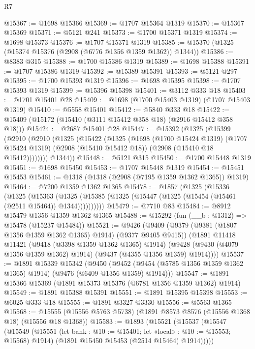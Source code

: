 \begin{lexlean}{R7}
\begin{coremodule}
@15367 := @1698 @15366
@15369 := @1707 @15364 @1319
@15370 := @15367 @15369
@15371 := @5121 @241
@15373 := @1700 @15371 @1319
@15374 := @1698 @15373
@15376 := @1707 @15371 @1319
@15385 := @15370 (@1325 (@15374 @15376 (@2908 (@6776 @1356 @1359 @1362)) @1344))
@15386 := @8383 @315
@15388 := @1700 @15386 @1319
@15389 := @1698 @15388
@15391 := @1707 @15386 @1319
@15392 := @15389 @15391
@15393 := @5121 @297
@15395 := @1700 @15393 @1319
@15396 := @1698 @15395
@15398 := @1707 @15393 @1319
@15399 := @15396 @15398
@15401 := @3112 @333 @18
@15403 := @1701 @15401 @28
@15409 := @1698 (@1700 @15403 @1319) (@1707 @15403 @1319)
@15410 := @5558 @15401
@15412 := @5840 @333 @18
@15422 := @15409 (@15172 (@15410 (@3111 @15412 @358 @18) (@2916 @15412 @358 @18)))
@15424 := @2687 @15401 @28
@15447 := @15392
    (@1325
      (@15399
        (@2910
          (@2910
            (@1325
              (@15422
                (@1325
                  (@1698
                    (@1700 @15424 @1319)
                    (@1707 @15424 @1319)
                    (@2908 (@15410 @15412 @18))
                    (@2908 (@15410 @18 @15412))))))))
        @1344))
@15448 := @5121 @315
@15450 := @1700 @15448 @1319
@15451 := @1698 @15450
@15453 := @1707 @15448 @1319
@15454 := @15451 @15453
@15461 := @1318 (@1318 (@2908 (@7195 @1359 @1362 @1365)) @1319)
@15464 := @7200 @1359 @1362 @1365
@15478 := @1857
    (@1325
      (@15336
        (@1325
          (@15363
            (@1325 (@15385 (@1325 (@15447 (@1325 (@15454 (@15461 (@2511 @15464)) @1344))))))))))
@15479 := @7710 @83
@15484 := @8912 @15479 @1356 @1359 @1362 @1365
@15488 := @15292 (fun (__b : @1312) => @15478 (@15237 @15484))
@15521 := @9426
    (@9409
      (@9379 (@9381 (@1807 @1356 @1359 @1362 @1365) @1914) (@9377 @9405 @9415))
      (@1891
        @11418
        @11421
        (@9418 (@3398 @1359 @1362 @1365) @1914)
        (@9428 (@9430 (@4079 @1356 @1359 @1362) @1914) (@9437 (@4355 @1356 @1359) @1914))))
@15537 := @1891
    @15339
    @15342
    (@9450 (@9452 (@9454 (@5785 @1356 @1359 @1362 @1365) @1914) (@9476 (@6409 @1356 @1359) @1914)))
@15547 := @1891 @15366 @15369 (@1891 @15373 @15376 (@6781 @1356 @1359 @1362) @1914)
@15549 := @1891 @15388 @15391
@15551 := @1891 @15395 @15398
@15553 := @6025 @333 @18
@15555 := @1891 @3327 @3330
@15556 := @5563 @1365
@15568 := @15555 (@15556 @5763 @5738) (@1891 @8573 @8576 (@15556 @1368 @18) (@15556 @18 @1368))
@15583 := @1893
    (@15521
      (@15537
        (@15547
          (@15549
            (@15551 (let bank : @10 := @15401; let «local» : @10 := @15553; @15568) @1914)
            (@1891 @15450 @15453 (@2514 @15464) @1914)))))

\end{coremodule}
\end{lexlean}
